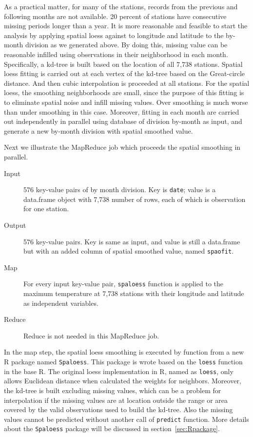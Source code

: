 As a practical matter, for many of the stations, records from the previous and
following months are not available. 20 percent of stations have consecutive 
missing periods longer than a year. It is more reasonable and
feasible to start the analysis by applying spatial loess against to longitude and 
latitude to the by-month division as we generated above. By doing this, missing 
value can be reasonable infilled using observations in their neighborhood in each 
month. Specifically, a kd-tree \cite{bentley1980multidimensional} is built based 
on the location of all 7,738 stations. Spatial loess fitting is carried out at
each vertex of the kd-tree based on the Great-circle distance. And then cubic 
interpolation is proceeded at all stations. For the spatial loess, the smoothing
neighborhoods are small, since the purpose of this fitting is to eliminate 
spatial noise and infill missing values. Over smoothing is much worse than 
under smoothing in this case.   
Moreover, fitting in each month are carried out independently in parallel using 
database of division by-month as input, and generate a new by-month division with 
spatial smoothed value.

Next we illustrate the MapReduce job which proceeds the spatial smoothing in 
parallel.
\begin{description}
  \item[Input] 576 key-value pairs of by month division. Key is \texttt{date}; 
  value is a data.frame object with 7,738 number of rows, each of which is 
  observation for one station.
  \item[Output] 576 key-value pairs. Key is same as input, and value is still
  a data.frame but with an added column of spatial smoothed value, named 
  \texttt{spaofit}. 
  \item[Map]For every input key-value pair, \texttt{spaloess} function is applied
  to the maximum temperature at 7,738 stations with their longitude and latitude 
  as independent variables.
  \item[Reduce] Reduce is not needed in this MapReduce job.
\end{description}

In the map step, the spatial loess smoothing is executed by function from a new 
R package named \texttt{Spaloess}. This package is wrote based on the 
\texttt{loess} function in the base R. The original loess implementation in R, 
named as \texttt{loess}, only allows Euclidean distance when calculated the 
weights for neighbors. Moreover, the kd-tree is built excluding missing values, 
which can be a problem for interpolation if the missing values are at location 
outside the range or area covered by the valid observations used to build the 
kd-tree. Also the missing values cannot be predicted without another call of 
\texttt{predict} function. More details about the \texttt{Spaloess} package will 
be discussed in section~\ref{sec:Rpackage}.

